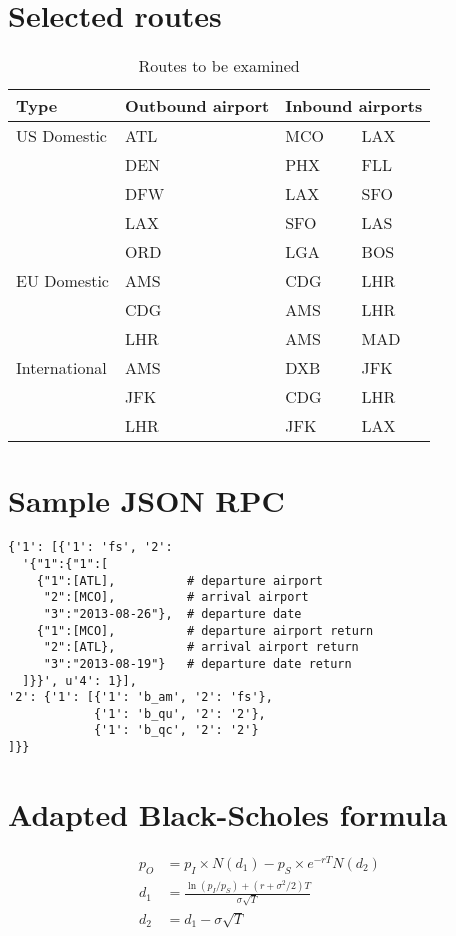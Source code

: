 \chapter{Selected routes}
\label{app:SelectedRoutes}
\begin{table}[h]
	\centering
    \begin{tabular}{ l | l | l l }
        Type        & Outbound airport & \multicolumn{2}{c}{Inbound airports}        \\ \hline \hline
        US Domestic & ATL & MCO & LAX \\
        ~           & DEN & PHX & FLL \\
        ~           & DFW & LAX & SFO \\
        ~           & LAX & SFO & LAS \\
        ~           & ORD & LGA & BOS \\
        EU Domestic & AMS & CDG & LHR \\
		~           & CDG & AMS & LHR \\
		~           & LHR & AMS & MAD \\
        International & AMS & DXB & JFK \\ 
        ~             & JFK & CDG & LHR \\
        ~             & LHR & JFK & LAX \\
    \end{tabular}
	\caption{Routes to be examined}
\end{table}

\chapter{Sample JSON RPC}
\label{app:SampleJSONRPC}
\small
\begin{verbatim}
{'1': [{'1': 'fs', '2':
  '{"1":{"1":[
    {"1":[ATL],          # departure airport
     "2":[MCO],          # arrival airport
     "3":"2013-08-26"},  # departure date
    {"1":[MCO],          # departure airport return
     "2":[ATL},          # arrival airport return
     "3":"2013-08-19"}   # departure date return
  ]}}', u'4': 1}],
'2': {'1': [{'1': 'b_am', '2': 'fs'},
            {'1': 'b_qu', '2': '2'},
            {'1': 'b_qc', '2': '2'}
]}}
\end{verbatim}

\chapter{Adapted Black-Scholes formula}
\label{app:AdaptedBlackScholesFormula}
\begin{align*}
p_O &= p_I \times N(d_1) - p_S \times e^{-rT}N(d_2) \\
d_1 &= \frac{\ln(p_I/p_S) + (r + \sigma^2/2)T}{\sigma \sqrt{T}} \\
d_2 &= d_1 - \sigma \sqrt{T}
\end{align*}

